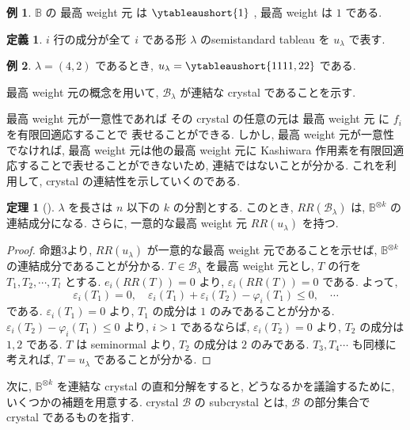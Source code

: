\documentclass[
  a4paper, 
  12pt,
  ja=standard,
  xelatex,
  left=30truemm,
  right=30truemm,
  titlepage 
]{bxjsarticle}
\theoremstyle{definition}
\newtheorem{df}{定義}[section]
\newtheorem{thm}{定理}[section]
\newtheorem*{ex}{例}
\begin{document}
\begin{ex}
  $\mathbb{B}$ の 最高 weight 元 は $\ytableaushort{1}$ , 最高 weight は $1$ である.
\end{ex}

\begin{df}
  $i$ 行の成分が全て $i$ である形 $\lambda$ のsemistandard tableau を $u_\lambda$ で表す.
\end{df}

\begin{ex}
  $\lambda= (4, 2)$ であるとき, $u_\lambda = \ytableaushort{1111,22}$ である.
\end{ex}

最高 weight 元の概念を用いて, $\mathcal{B}_{\lambda}$ が連結な crystal であることを示す.

最高 weight 元が一意性であれば
その crystal の任意の元は 最高 weight 元 に $f_i$ を有限回適応することで
表せることができる.
しかし, 最高 weight 元が一意性でなければ, 最高 weight 元は他の最高 weight 元に
Kashiwara 作用素を有限回適応することで表せることができないため, 連結ではないことが分かる.
これを利用して, crystal の連結性を示していくのである.

\begin{thm}[{\cite[定理3.2]{b2}}] \label{crystal-of-tableau}
  $\lambda$ を長さは $n$ 以下の $k$ の分割とする.
  このとき, $RR(\mathcal{B}_{\lambda})$ は, $\mathbb{B}^{\otimes k}$ の連結成分になる.
  さらに, 一意的な最高 weight 元 $RR(u_\lambda)$ を持つ.
\end{thm}

\begin{proof}
  命題3より, $RR(u_\lambda)$ が一意的な最高 weight 元であることを示せば, $\mathbb{B}^{\otimes k}$ の連結成分であることが分かる.
  $T \in \mathcal{B}_{\lambda}$ を最高 weight 元とし, $T$ の行を $T_1, T_2, \cdots, T_l$ とする.
  $e_i(RR(T)) = 0$ より, $\varepsilon_i(RR(T)) = 0$ である. よって,
  $$\varepsilon_i(T_1) = 0, \quad \varepsilon_i(T_1) + \varepsilon_i(T_2) - \varphi_i(T_1) \leq 0, \quad  \cdots $$
  である. $\varepsilon_i(T_1) = 0$ より, $T_1$ の成分は $1$ のみであることが分かる.
  $\varepsilon_i(T_2) - \varphi_i(T_1) \leq 0$ より, $i > 1$ であるならば, $\varepsilon_i(T_2) = 0$ より,
  $T_2$ の成分は $1, 2$ である. $T$ は seminormal より, $T_2$ の成分は $2$ のみである.
  $T_3, T_4 \cdots$ も同様に考えれば, $T = u_\lambda$ であることが分かる.
\end{proof}

次に, $\mathbb{B}^{ \otimes k}$ を連結な crystal の直和分解をすると,
どうなるかを議論するために, いくつかの補題を用意する.
crystal $\mathcal{B}$ の subcrystal とは, $\mathcal{B}$
の部分集合で crystal であるものを指す.
\end{document}
